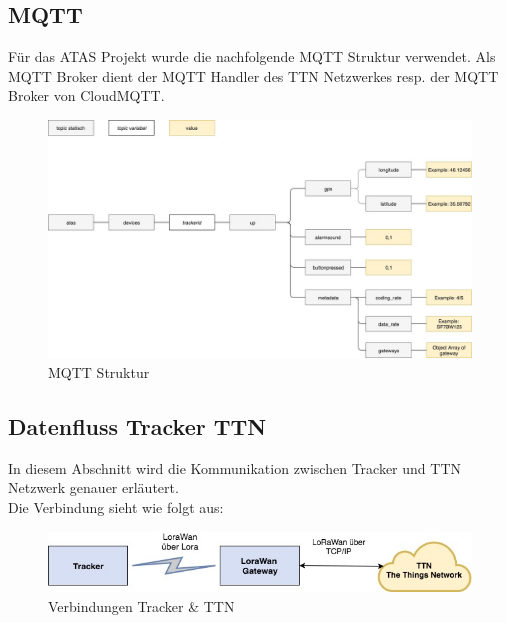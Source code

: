 \documentclass[11pt,english,german]{report}
\theoremstyle{definition}
\begin{document}
\subsection{MQTT}
Für das ATAS Projekt wurde die nachfolgende MQTT Struktur verwendet. Als MQTT Broker dient der MQTT Handler des TTN Netzwerkes resp. der MQTT Broker von CloudMQTT.
\begin{figure}[H]
	\centering
	\includegraphics[width=\textwidth]{img/system/ATAS_MQTT_Topic_BA.jpg}
	\caption[MQTT Struktur]
	{MQTT Struktur}
\end{figure}

\subsection{Datenfluss Tracker TTN}
In diesem Abschnitt wird die Kommunikation zwischen Tracker und TTN Netzwerk genauer erläutert.\\[0.3cm]
Die Verbindung sieht wie folgt aus:
\begin{figure}[H]
	\centering
	\includegraphics[width=\textwidth]{img/system/dataflow_tracker2ttn_connection.jpg}
	\caption[Verbindungen Tracker \& TTN]
	{Verbindungen Tracker \& TTN}
\end{figure}
\end{document}
